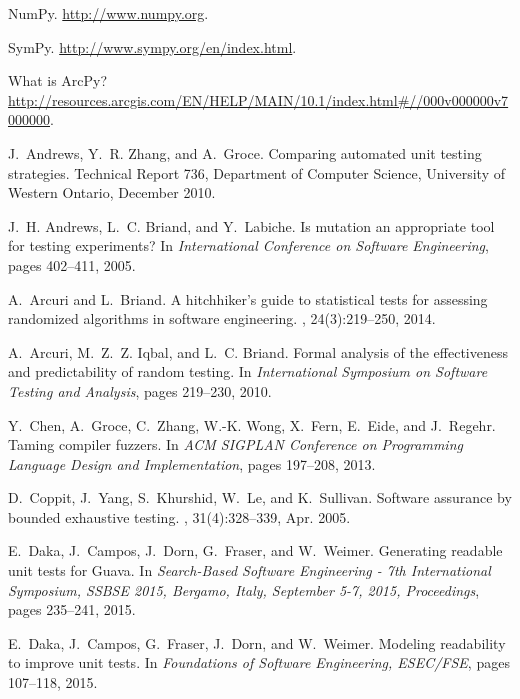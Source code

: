 \documentclass[format=sigconf]{acmart}
\begin{document}
\begin{thebibliography}{10}

{NumPy}.
\newblock \url{http://www.numpy.org}.

{SymPy}.
\newblock \url{http://www.sympy.org/en/index.html}.

What is {ArcPy}?
\newblock
  \url{http://resources.arcgis.com/EN/HELP/MAIN/10.1/index.html#//000v000000v7000000}.

J.~Andrews, Y.~R. Zhang, and A.~Groce.
\newblock Comparing automated unit testing strategies.
\newblock Technical Report 736, Department of Computer Science, University of
  Western Ontario, December 2010.

J.~H. Andrews, L.~C. Briand, and Y.~Labiche.
\newblock Is mutation an appropriate tool for testing experiments?
\newblock In {\em International Conference on Software Engineering}, pages
  402--411, 2005.

A.~Arcuri and L.~Briand.
\newblock A hitchhiker's guide to statistical tests for assessing randomized
  algorithms in software engineering.
, 24(3):219--250,
  2014.

A.~Arcuri, M.~Z.~Z. Iqbal, and L.~C. Briand.
\newblock Formal analysis of the effectiveness and predictability of random
  testing.
\newblock In {\em International Symposium on Software Testing and Analysis},
  pages 219--230, 2010.

Y.~Chen, A.~Groce, C.~Zhang, W.-K. Wong, X.~Fern, E.~Eide, and J.~Regehr.
\newblock Taming compiler fuzzers.
\newblock In {\em ACM SIGPLAN Conference on Programming Language Design and
  Implementation}, pages 197--208, 2013.

D.~Coppit, J.~Yang, S.~Khurshid, W.~Le, and K.~Sullivan.
\newblock Software assurance by bounded exhaustive testing.
, 31(4):328--339, Apr.
  2005.

E.~Daka, J.~Campos, J.~Dorn, G.~Fraser, and W.~Weimer.
\newblock Generating readable unit tests for {Guava}.
\newblock In {\em Search-Based Software Engineering - 7th International
  Symposium, {SSBSE} 2015, Bergamo, Italy, September 5-7, 2015, Proceedings},
  pages 235--241, 2015.

E.~Daka, J.~Campos, G.~Fraser, J.~Dorn, and W.~Weimer.
\newblock Modeling readability to improve unit tests.
\newblock In {\em Foundations of Software Engineering, {ESEC/FSE}}, pages
  107--118, 2015.


\end{thebibliography}
\end{document}
